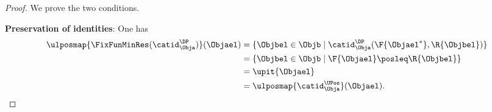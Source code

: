 \begin{proof}
    We prove the two conditions.

    \textbf{Preservation of identities}:
    One has
    \begin{equation*}
        \begin{aligned}
            \ulposmap{\FixFunMinRes(\catid_{\Obja}^{\DP})}(\Objael) & =\{ \Objbel\in \Objb\mid \catid_{\Obja}^{\DP}(\F{\Objael^*},\R{\Objbel})\} \\
                                                                    & =\{ \Objbel \in \Objb\mid \F{\Objael}\posleq\R{\Objbel}\}                  \\
                                                                    & =\upit \{ \Objael\}                                                        \\
                                                                    & =\ulposmap{\catid_{\Obja}^{\UPos}}(\Objael).
        \end{aligned}
    \end{equation*}


\end{proof}
